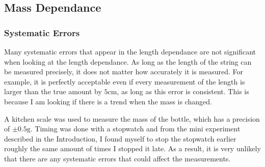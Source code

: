 \documentclass[%
 reprint,
 amsmath,amssymb
 aps,
]{revtex4-2}
\begin{document}
\subsection{Mass Dependance}
\subsubsection{Systematic Errors}
Many systematic errors that appear in the length dependance are not significant when looking at the length dependance. As long as the length of the string can be measured precisely, it does not matter how accurately it is measured. For example, it is perfectly acceptable even if every measurement of the length is larger than the true amount by $5\si{\centi\meter}$, as long as this error is consistent. This is because I am looking if there is a trend when the mass is changed.

A kitchen scale was used to measure the mass of the bottle, which has a precision of $\pm 0.5\si{\gram}$. Timing was done with a stopwatch and from the mini experiment described in the Introduction, I found myself to stop the stopwatch earlier roughly the same amount of times I stopped it late. As a result, it is very unlikely that there are any systematic errors that could affect the measurements.
\end{document}
